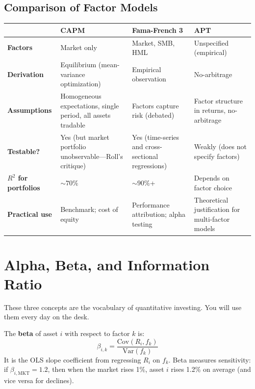 \subsection{Comparison of Factor Models}

\begin{center}
\begin{tabular}{p{3cm} p{3.5cm} p{3.5cm} p{3.5cm}}
\toprule
 & \textbf{CAPM} & \textbf{Fama-French 3} & \textbf{APT} \\
\midrule
\textbf{Factors} & Market only & Market, SMB, HML & Unspecified (empirical) \\
\textbf{Derivation} & Equilibrium (mean-variance optimization) & Empirical observation & No-arbitrage \\
\textbf{Assumptions} & Homogeneous expectations, single period, all assets tradable & Factors capture risk (debated) & Factor structure in returns, no-arbitrage \\
\textbf{Testable?} & Yes (but market portfolio unobservable---Roll's critique) & Yes (time-series and cross-sectional regressions) & Weakly (does not specify factors) \\
\textbf{$R^2$ for portfolios} & ${\sim}70\%$ & ${\sim}90\%$+ & Depends on factor choice \\
\textbf{Practical use} & Benchmark; cost of equity & Performance attribution; alpha testing & Theoretical justification for multi-factor models \\
\bottomrule
\end{tabular}
\end{center}

\section{Alpha, Beta, and Information Ratio}
\label{sec:alpha-beta-ir}

These three concepts are the vocabulary of quantitative investing. You will use them every day on the desk.

\begin{definition}[Beta]
The \textbf{beta} of asset $i$ with respect to factor $k$ is:
\begin{equation}
\beta_{i,k} = \frac{\text{Cov}(R_i, f_k)}{\text{Var}(f_k)}
\label{eq:beta}
\end{equation}
It is the OLS slope coefficient from regressing $R_i$ on $f_k$. Beta measures sensitivity: if $\beta_{i,\text{MKT}} = 1.2$, then when the market rises 1\%, asset $i$ rises 1.2\% on average (and vice versa for declines).
\end{definition}

